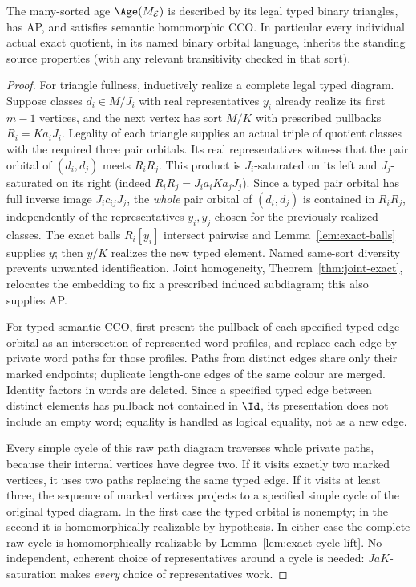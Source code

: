 \begin{theorem}
\label{thm:exact-sorts-source}
The many-sorted age $\Age(M_{\mathcal E})$ is described by its legal
typed binary triangles, has AP, and satisfies semantic homomorphic
CCO. In particular every individual actual exact quotient, in its
named binary orbital language, inherits the standing source
properties (with any relevant transitivity checked in that sort).
\end{theorem}
\begin{proof}
For triangle fullness, inductively realize a complete legal typed
diagram. Suppose classes $d_i\in M/J_i$ with real representatives
$y_i$ already realize its first $m-1$ vertices, and the next vertex
has sort $M/K$ with prescribed pullbacks $R_i=Ka_iJ_i$.
Legality of each triangle supplies an actual triple of quotient
classes with the required three pair orbitals.  Its real
representatives witness that the pair orbital of $(d_i,d_j)$
meets $R_iR_j$.  This product is $J_i$-saturated on its left
and $J_j$-saturated on its right (indeed
$R_iR_j=J_i a_i K a_j J_j$).  Since a typed pair orbital has
full inverse image $J_i c_{ij}J_j$, the \emph{whole} pair orbital
of $(d_i,d_j)$ is contained in $R_iR_j$, independently of the
representatives $y_i,y_j$ chosen for the previously realized
classes. The exact balls $R_i[y_i]$ intersect pairwise and
Lemma~\ref{lem:exact-balls} supplies $y$; then $y/K$ realizes the
new typed element. Named same-sort diversity prevents unwanted
identification. Joint homogeneity, Theorem~\ref{thm:joint-exact},
relocates the embedding to fix a prescribed induced subdiagram;
this also supplies AP.

For typed semantic CCO, first present the pullback of each
specified typed edge orbital as an intersection of represented
word profiles, and replace each edge by private word paths for
those profiles.  Paths from distinct edges share only their marked
endpoints; duplicate length-one edges of the same colour are
merged.  Identity factors in words are deleted.  Since a
specified typed edge between distinct elements has pullback not
contained in $\Id$, its presentation does not include an empty
word; equality is handled as logical equality, not as a new edge.

Every simple cycle of this raw path diagram traverses whole
private paths, because their internal vertices have degree two.
If it visits exactly two marked vertices, it uses two paths
replacing the same typed edge.  If it visits at least three, the
sequence of marked vertices projects to a specified simple cycle
of the original typed diagram.  In the first case the typed
orbital is nonempty; in the second it is homomorphically
realizable by hypothesis.  In either case the complete raw cycle
is homomorphically realizable by
Lemma~\ref{lem:exact-cycle-lift}.  No independent, coherent choice
of representatives around a cycle is needed: $JaK$-saturation
makes \emph{every} choice of representatives work.


\end{proof}
